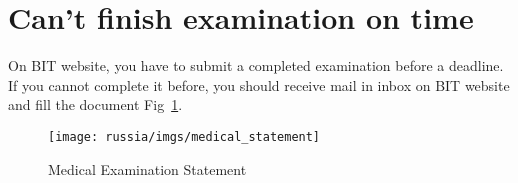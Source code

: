 \section{Can't finish examination on time}

On BIT website, you have to submit a completed examination before a deadline.
If you cannot complete it before,
you should receive mail in inbox on BIT website and fill the document Fig~\ref{fig:ru_med_state}.


\begin{figure}[htpb]
    \centering
    \texttt{[image: russia/imgs/medical\_statement]}
    \caption{\centering Medical Examination Statement}
    \label{fig:ru_med_state}
\end{figure}
